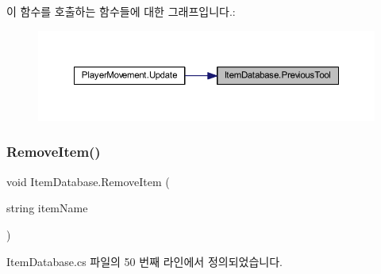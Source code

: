 이 함수를 호출하는 함수들에 대한 그래프입니다.\+:\nopagebreak
\begin{figure}[H]
\begin{center}
\leavevmode
\includegraphics[width=350pt]{d0/dc6/class_item_database_aa47d8d6f06cb4aff0254dca75e48ec48_icgraph}
\end{center}
\end{figure}
\mbox{\label{class_item_database_a86349d3b40c7195b530638ffd0d5d958}} 
\subsubsection{\texorpdfstring{RemoveItem()}{RemoveItem()}}
{\footnotesize\ttfamily void Item\+Database.\+Remove\+Item (\begin{DoxyParamCaption}\item[{string}]{item\+Name }\end{DoxyParamCaption})}



Item\+Database.\+cs 파일의 50 번째 라인에서 정의되었습니다.


